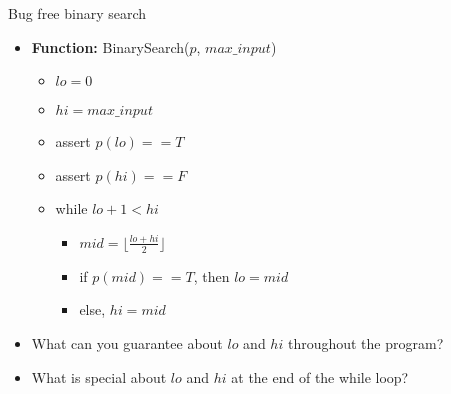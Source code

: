 \documentclass[t]{beamer}
\begin{document}
\begin{frame}{Bug free binary search}
\begin{itemize}
    \item
    
    \textbf{Function:} BinarySearch($p$, $max\_input$)
    
    \begin{itemize}
    
        \item
        
        $lo = 0$
        
        \item
        
        $hi = max\_input$
        
        \item 
        
        assert $p(lo) == T$
        
        \item 
        
        assert $p(hi) == F$

        \item
        
        while $lo + 1 < hi$
        
        \begin{itemize}
        
            \item
            
            $mid = \lfloor \frac{lo + hi}{2} \rfloor$
            
            \item
            
            if $p(mid) == T$, then $lo = mid$
            
            \item
                
            else, $hi = mid$
            
        \end{itemize}
        
    \end{itemize}

    \pause 
    
    \item What can you guarantee about $lo$ and $hi$ throughout the program?
    
    \pause
    
    \item What is special about $lo$ and $hi$ at the end of the while loop?
    
\end{itemize}
\end{frame}
\end{document}
